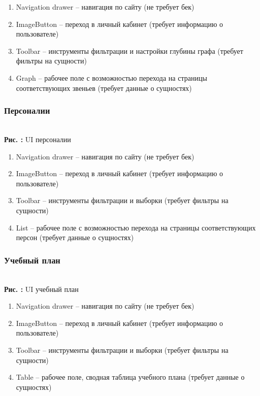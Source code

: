 \documentclass[12pt,a4paperб]{article}
\newcounter{picture}
\newcommand{\embedsvg}[3]{\begin{center}
		
		\\\textbf{Рис. \thepicture:} #3
		\label{pic_\thepicture}
		\addtocounter{picture}{1}
\end{center}}
\begin{document}
	 \begin{enumerate}
	 	\item Navigation drawer -- навигация по сайту (не требует бек)
	 	\item ImageButton -- переход в личный кабинет (требует информацию о пользователе)
	 	\item Toolbar -- инструменты фильтрации и настройки глубины графа (требует фильтры на сущности)
	 	\item Graph -- рабочее поле с возможностью перехода на страницы соответствующих звеньев (требует данные о сущностях)
	 \end{enumerate}
	 
	 \subsubsection{Персоналии}
	 
	 \embedsvg{people.svg}{0.7}{UI персоналии}
	 
	 \begin{enumerate}
	 	\item Navigation drawer -- навигация по сайту (не требует бек)
	 	\item ImageButton -- переход в личный кабинет (требует информацию о пользователе)
	 	\item Toolbar -- инструменты фильтрации  и выборки (требует фильтры на сущности)
	 	\item List -- рабочее поле с возможностью перехода на страницы соответствующих персон (требует данные о сущностях)
	 \end{enumerate}
	 
	 \subsubsection{Учебный план}
	 
	 \embedsvg{plan.svg}{0.7}{UI учебный план}
	 
	 \begin{enumerate}
	 	\item Navigation drawer -- навигация по сайту (не требует бек)
	 	\item ImageButton -- переход в личный кабинет (требует информацию о пользователе)
	 	\item Toolbar -- инструменты фильтрации и выборки (требует фильтры на сущности)
	 	\item Table -- рабочее поле, сводная таблица учебного плана (требует данные о сущностях)
	 \end{enumerate}
	 
\end{document}
